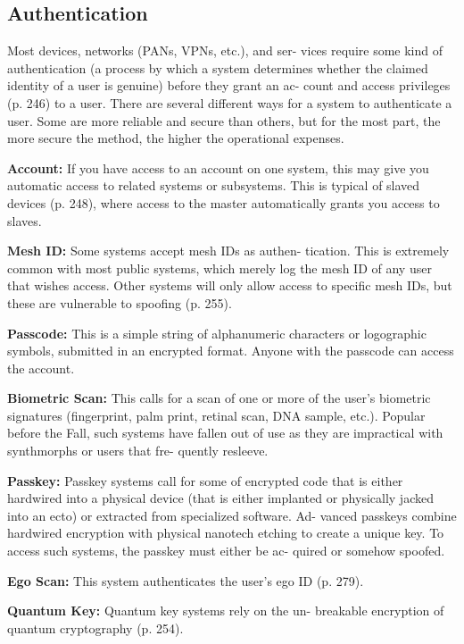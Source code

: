 \subsection{Authentication}

Most devices, networks (PANs, VPNs, etc.), and ser-
vices require some kind of authentication (a process 
by which a system determines whether the claimed 
identity of a user is genuine) before they grant an ac-
count and access privileges (p. 246) to a user. There 
are several different ways for a system to authenticate 
a user. Some are more reliable and secure than others, 
but for the most part, the more secure the method, the 
higher the operational expenses.

\textbf{Account:} If you have access to an account on one 
system, this may give you automatic access to related 
systems or subsystems. This is typical of slaved devices 
(p. 248), where access to the master automatically 
grants you access to slaves.

\textbf{Mesh ID:} Some systems accept mesh IDs as authen-
tication. This is extremely common with most public 
systems, which merely log the mesh ID of any user 
that wishes access. Other systems will only allow 
access to specific mesh IDs, but these are vulnerable 
to spoofing (p. 255).

\textbf{Passcode:} This is a simple string of alphanumeric 
characters or logographic symbols, submitted in an 
encrypted format. Anyone with the passcode can 
access the account.

\textbf{Biometric Scan:} This calls for a scan of one or more 
of the user's biometric signatures (fingerprint, palm 
print, retinal scan, DNA sample, etc.). Popular before 
the Fall, such systems have fallen out of use as they 
are impractical with synthmorphs or users that fre-
quently resleeve.

\textbf{Passkey:} Passkey systems call for some of encrypted 
code that is either hardwired into a physical device 
(that is either implanted or physically jacked into 
an ecto) or extracted from specialized software. Ad-
vanced passkeys combine hardwired encryption with 
physical nanotech etching to create a unique key. To 
access such systems, the passkey must either be ac-
quired or somehow spoofed.

\textbf{Ego Scan:} This system authenticates the user's ego 
ID (p. 279).

\textbf{Quantum Key:} Quantum key systems rely on the un-
breakable encryption of quantum cryptography (p. 254).

